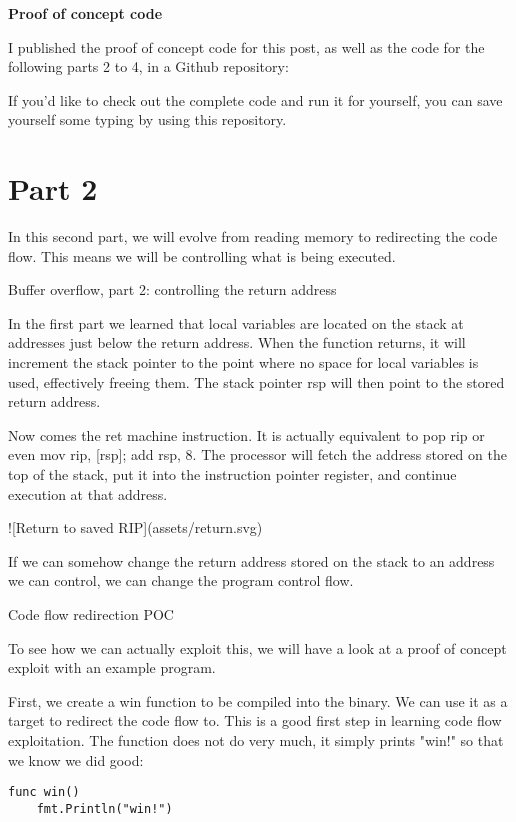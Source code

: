 \textbf{Proof of concept code}

I published the proof of concept code for this post, as well as the code for the following parts 2 to 4, in a Github
repository:

If you'd like to check out the complete code and run it for yourself, you can save yourself some typing by using this
repository.




\section{Part 2}

In this second part, we will evolve from reading memory to redirecting the code flow. This means we will be controlling
what is being executed. 

 Buffer overflow, part 2: controlling the return address

In the first part we learned that local variables are located on the stack at addresses just below the return address.
When the function returns, it will increment the stack pointer to the point where no space for local variables is used,
effectively freeing them. The stack pointer rsp will then point to the stored return address.

Now comes the ret machine instruction. It is actually equivalent to pop rip or even mov rip, [rsp]; add rsp, 8.
The processor will fetch the address stored on the top of the stack, put it into the instruction pointer register, and
continue execution at that address.

![Return to saved RIP](assets/return.svg)

If we can somehow change the return address stored on the stack to an address we can control, we can change the program
control flow.


 Code flow redirection POC

To see how we can actually exploit this, we will have a look at a proof of concept exploit with an example program.

First, we create a win function to be compiled into the binary. We can use it as a target to redirect the code
flow to. This is a good first step in learning code flow exploitation. The function does not do very much, it simply prints
"win!" so that we know we did good:

\begin{lstlisting}[language=Golang, label=lst:win-function, caption=Target function \texttt{win} for code flow redirection]
func win() 
    fmt.Println("win!")
\end{lstlisting}

